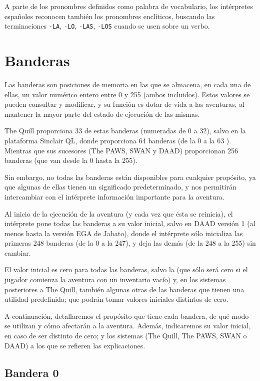 \documentclass[11pt, a5paper]{article}
\newcommand{\quill}{\textsf{The Quill}\xspace}
\newcommand{\paw}{\textsf{The PAWS}\xspace}
\newcommand{\swan}{\textsf{SWAN}\xspace}
\newcommand{\daad}{\textsf{DAAD}\xspace}
\begin{document}
A parte de los pronombres definidos como palabra de vocabulario, los intérpretes españoles reconocen también los pronombres enclíticos, buscando las terminaciones \texttt{-LA}, \texttt{-LO}, \texttt{-LAS}, \texttt{-LOS} cuando se usen sobre un verbo.


\section{Banderas}

Las banderas son posiciones de memoria en las que se almacena, en cada una de ellas, un valor numérico entero entre 0 y 255 (ambos incluidos). Estos valores se pueden consultar y modificar, y su función es dotar de vida a las aventuras, al mantener la mayor parte del estado de ejecución de las mismas.

\quill proporciona 33 de estas banderas (numeradas de 0 a 32), salvo en la plataforma Sinclair QL, donde proporciona 64 banderas (de la 0 a la 63 \cite{QuillQL}). Mientras que sus sucesores (\paw, \swan y \daad) proporcionan 256 banderas (que van desde la 0 hasta la 255).

Sin embargo, no todas las banderas están disponibles para cualquier propósito, ya que algunas de ellas tienen un significado predeterminado, y nos permitirán intercambiar con el intérprete información importante para la aventura.

Al inicio de la ejecución de la aventura (y cada vez que ésta se reinicia), el intérprete pone todas las banderas a su valor inicial, salvo en \daad versión 1 (al menos hasta la versión EGA de Jabato), donde el intérprete sólo inicializa las primeras 248 banderas (de la 0 a la 247), y deja las demás (de la 248 a la 255) sin cambiar.

El valor inicial es cero para todas las banderas, salvo la  (que sólo será cero si el jugador comienza la aventura con un inventario vacío) y, en los sistemas posteriores a \quill, también algunas otras de las banderas que tienen una utilidad predefinida; que podrán tomar valores iniciales distintos de cero.

A continuación, detallaremos el propósito que tiene cada bandera, de qué modo se utilizan y cómo afectarán a la aventura. Además, indicaremos su valor inicial, en caso de ser distinto de cero; y los sistemas (\quill, \paw, \swan o \daad) a los que se refieren las explicaciones.

\subsection{Bandera 0}
\end{document}
